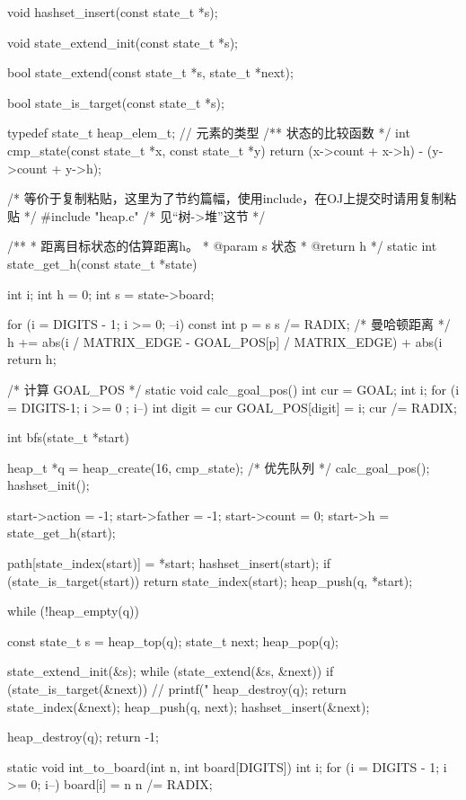 \begin{Codex}[label=eight_digits_astar.c]
void hashset_insert(const state_t *s);

void state_extend_init(const state_t *s);

bool state_extend(const state_t *s, state_t *next);

bool state_is_target(const state_t *s);

typedef state_t heap_elem_t; // 元素的类型
/** 状态的比较函数 */
int cmp_state(const state_t *x, const state_t *y) {
    return (x->count + x->h) - (y->count + y->h);
}

/* 等价于复制粘贴，这里为了节约篇幅，使用include，在OJ上提交时请用复制粘贴 */
#include "heap.c"  /* 见“树->堆”这节 */

/**
 * 距离目标状态的估算距离h。
 * @param s 状态
 * @return h
 */
static int state_get_h(const state_t *state) {
    int i;
    int h = 0;
    int s = state->board;

    for (i = DIGITS - 1; i >= 0; --i) {
        const int p = s %
        s /= RADIX;
        /* 曼哈顿距离 */
        h += abs(i / MATRIX_EDGE - GOAL_POS[p] / MATRIX_EDGE) +
            abs(i %
    }
    return h;
}

/* 计算 GOAL_POS */
static void calc_goal_pos() {
    int cur = GOAL;
    int i;
    for (i = DIGITS-1; i >= 0 ; i--) {
        int digit = cur %
        GOAL_POS[digit] = i;
        cur /= RADIX;
    }
}

int bfs(state_t *start) {
    heap_t *q = heap_create(16, cmp_state); /* 优先队列 */
    calc_goal_pos();
    hashset_init();

    start->action = -1;
    start->father = -1;
    start->count = 0;
    start->h = state_get_h(start);

    path[state_index(start)] = *start;
    hashset_insert(start);
    if (state_is_target(start))
        return state_index(start);
    heap_push(q, *start);

    while (!heap_empty(q)) {
        const state_t s = heap_top(q);
        state_t next;
        heap_pop(q);

        state_extend_init(&s);
        while (state_extend(&s, &next)) {
            if (state_is_target(&next)) {
                // printf("%
                heap_destroy(q);
                return state_index(&next);
            }
            heap_push(q, next);
            hashset_insert(&next);
        }
    }
    heap_destroy(q);
    return -1;
}

static void int_to_board(int n, int board[DIGITS]) {
    int i;
    for (i = DIGITS - 1; i >= 0; i--) {
        board[i] = n %
        n /= RADIX;
    }
}


\end{Codex}
